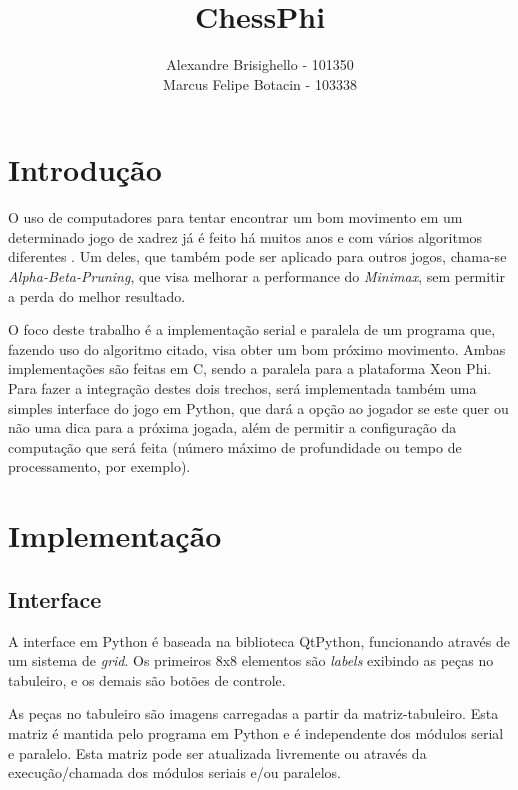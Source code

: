 \documentclass[12pt,a4paper,final]{article}
\author{Alexandre Brisighello - 101350 \\ Marcus Felipe Botacin - 103338}
\title{ChessPhi}
\begin{document}
\onehalfspace %

\maketitle
\newpage
\tableofcontents
\newpage


\section{Introdução}

O uso de computadores para tentar encontrar um bom movimento em um determinado jogo de xadrez já é feito há muitos anos e com vários algoritmos diferentes . Um deles, que também pode ser aplicado para outros jogos, chama-se \textit{Alpha-Beta-Pruning}, que visa melhorar a performance do \textit{Minimax}, sem permitir a perda do melhor resultado.

O foco deste trabalho é a implementação serial e paralela de um programa que, fazendo uso do algoritmo citado, visa obter um bom próximo movimento. Ambas implementações são feitas em C, sendo a paralela para a plataforma Xeon Phi. Para fazer a integração destes dois trechos, será implementada também uma simples interface do jogo em Python, que dará a opção ao jogador se este quer ou não uma dica para a próxima jogada, além de permitir a configuração da computação que será feita (número máximo de profundidade ou tempo de processamento, por exemplo). 

\section{Implementação}

\subsection{Interface}

A interface em Python é baseada na biblioteca QtPython, funcionando através de um sistema de \textit{grid}. Os primeiros 8x8 elementos são \textit{labels} exibindo as peças no tabuleiro, e os demais são botões de controle. 

As peças no tabuleiro são imagens carregadas a partir da matriz-tabuleiro. Esta matriz é mantida pelo programa em Python e é independente dos módulos serial e paralelo. Esta matriz pode ser atualizada livremente ou através da execução/chamada dos módulos seriais e/ou paralelos.
\end{document}
